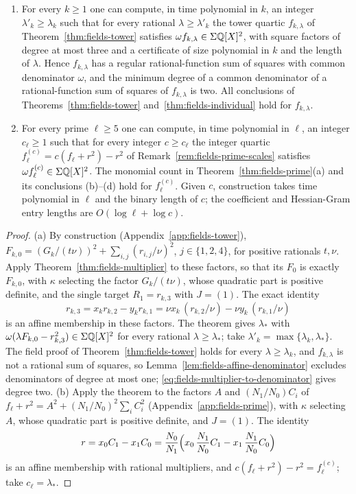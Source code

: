 \begin{corollary}
\label{cor:fields-tower-denominator}
\leavevmode
\begin{enumerate}[label=(\alph*)]
\item For every $k\ge1$ one can compute, in time polynomial in $k$, an
  integer $\lambda'_k\ge\lambda_k$ such that for every rational
  $\lambda\ge\lambda'_k$ the tower quartic $f_{k,\lambda}$ of
  Theorem~\ref{thm:fields-tower} satisfies
  $\omega f_{k,\lambda}\in\Sigma\mathbb Q[X]^2$, with square factors of degree at
  most three and a certificate of size polynomial in $k$ and the length of
  $\lambda$. Hence $f_{k,\lambda}$ has a regular rational-function sum of
  squares with common denominator $\omega$, and the minimum degree of a common
  denominator of a rational-function sum of squares of $f_{k,\lambda}$ is two.
  All conclusions of Theorems~\ref{thm:fields-tower}
  and~\ref{thm:fields-individual} hold for $f_{k,\lambda}$.
\item For every prime $\ell\ge5$ one can compute, in time polynomial in
  $\ell$, an integer $c_\ell\ge1$ such that for every integer $c\ge c_\ell$
  the integer quartic
  $f_\ell^{(c)}=c(f_\ell+r^2)-r^2$ of Remark~\ref{rem:fields-prime-scales}
  satisfies $\omega f_\ell^{(c)}\in\Sigma\mathbb Q[X]^2$. The monomial count in
  Theorem~\ref{thm:fields-prime}(a) and its conclusions (b)--(d) hold for
  $f_\ell^{(c)}$. Given $c$, construction takes time polynomial in $\ell$
  and the binary length of $c$; the coefficient and Hessian-Gram entry
  lengths are $O(\log\ell+\log c)$.
\end{enumerate}
\end{corollary}

\begin{proof}
(a) By construction (Appendix~\ref{app:fields-tower}),
$F_{k,0}=(G_k/(t\nu))^2+\sum_{i,j}(r_{i,j}/\nu)^2$, $j\in\{1,2,4\}$, for
positive rationals $t,\nu$. Apply Theorem~\ref{thm:fields-multiplier} to
these factors, so that its $F_0$ is exactly $F_{k,0}$, with $\kappa$
selecting the factor $G_k/(t\nu)$, whose quadratic part is positive
definite, and the single target $R_1=r_{k,3}$ with $J=(1)$. The exact
identity
\[
 r_{k,3}=x_kr_{k,2}-y_kr_{k,1}
 =\nu x_k\,(r_{k,2}/\nu)-\nu y_k\,(r_{k,1}/\nu)
\]
is an affine membership in these factors. The theorem gives $\lambda_*$ with
$\omega(\lambda F_{k,0}-r_{k,3}^2)\in\Sigma\mathbb Q[X]^2$ for every rational
$\lambda\ge\lambda_*$; take $\lambda'_k=\max\{\lambda_k,\lambda_*\}$. The
field proof of Theorem~\ref{thm:fields-tower} holds for every
$\lambda\ge\lambda_k$, and $f_{k,\lambda}$ is not a rational sum of squares,
so Lemma~\ref{lem:fields-affine-denominator} excludes denominators of degree
at most one; \eqref{eq:fields-multiplier-to-denominator} gives degree two.
(b) Apply the theorem to the factors $A$ and $(N_1/N_0)C_i$ of
$f_\ell+r^2=A^2+(N_1/N_0)^2\sum_iC_i^2$ (Appendix~\ref{app:fields-prime}),
with $\kappa$ selecting $A$, whose quadratic part is positive definite, and
$J=(1)$. The identity
\[
 r=x_0C_1-x_1C_0=\frac{N_0}{N_1}\Bigl(x_0\,\frac{N_1}{N_0}C_1
   -x_1\,\frac{N_1}{N_0}C_0\Bigr)
\]
is an affine membership with rational multipliers, and
$c(f_\ell+r^2)-r^2=f_\ell^{(c)}$; take $c_\ell=\lambda_*$.
\end{proof}

